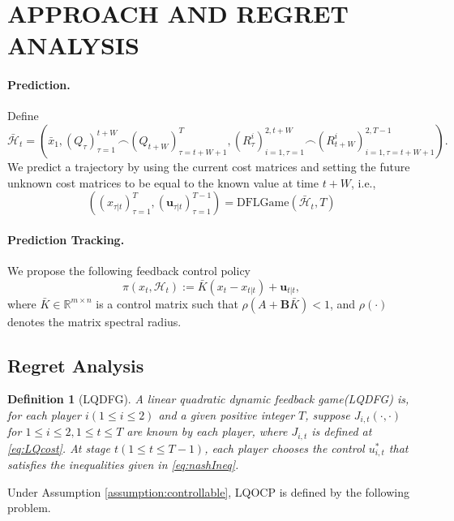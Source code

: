 \documentclass{article}
\newtheorem{definition}{Definition}
\begin{document}
\section{APPROACH AND REGRET ANALYSIS}
\paragraph{Prediction. } 
Define 
\begin{equation}
    \bar{\mathcal{H}}_{t} = (\bar{x}_{1}, (Q_{\tau})_{\tau=1}^{t+W} \frown(Q_{t+W})_{\tau=t+W+1}^{T}, (R_{\tau}^{i})_{i=1,\tau=1}^{2,t+W} \frown(R_{t+W}^{i})_{i=1,\tau=t+W+1}^{2,T-1}).
\end{equation}
We predict a trajectory by using the current cost matrices and setting the future unknown cost matrices to be equal to the known value at time $t+W$, i.e.,
\begin{equation}
    ((x_{\tau|t})_{\tau=1}^{T},(\mathbf{u}_{\tau|t})_{\tau=1}^{T-1}) = \text{DFLGame}(\bar{\mathcal{H}}_{t},T)
\end{equation}

\paragraph{Prediction Tracking. } We propose the following feedback control policy
\begin{equation}\label{eq:policy}
    \pi(x_{t},\mathcal{H}_{t}) := \bar{K}(x_{t}-x_{t|t}) + \mathbf{u}_{t|t},
\end{equation}
where $\bar{K}\in \mathbb{R}^{m\times n}$ is a control matrix such that $\rho(A+\mathbf{B}\bar{K}) < 1$, and $\rho(\cdot)$ denotes the matrix spectral radius.


\subsection{Regret Analysis}
\begin{definition}[LQDFG]\label{def:LQDFG}
    A linear quadratic dynamic feedback game(LQDFG) is, for each player $i(1\leq i\leq 2)$ and a given positive integer $T$, suppose $J_{i,t}(\cdot,\cdot)$ for $1\leq i\leq 2,1\leq t\leq T$ are known by each player, where $J_{i,t}$ is defined at \eqref{eq:LQcost}. At stage $t(1\leq t\leq T-1)$, each player chooses the control $u_{i,t}^{*}$ that satisfies the inequalities given in \eqref{eq:nashIneq}. 
\end{definition}

Under Assumption \ref{assumption:controllable}, LQOCP is defined by the following problem.
\end{document}
